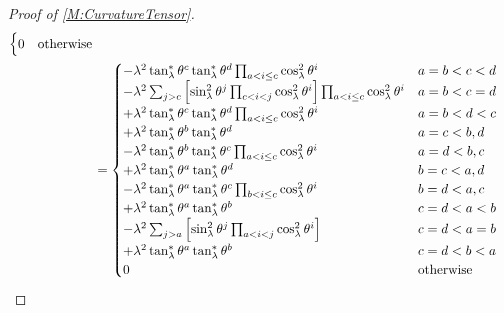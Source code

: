 \documentclass[../methodology.tex]{subfiles}
\begin{document}
\begin{proof}[Proof of \cref{M:CurvatureTensor}]
\begin{align*}
\begin{cases}
          0 & \text{otherwise}   \\
        \end{cases}                                                  \\
     & =\begin{cases}
          -\lambda^2\tan_\lambda^\ast\tensor{\theta}{^c}\tan_\lambda^\ast\tensor{\theta}{^d}\prod_{a<i\le c}\cos_\lambda^2\tensor{\theta}{^i}
            & \text{\(a=b<c<d\)} \\
          -\lambda^2
          \sum_{j>c}
          \left[
            \sin_\lambda^2\tensor{\theta}{^j}\prod_{c<i<j}\cos_\lambda^2\tensor{\theta}{^i}
            \right]
          \prod_{a<i\le c}\cos_\lambda^2\tensor{\theta}{^i}
            & \text{\(a=b<c=d\)} \\
          +\lambda^2\tan_\lambda^\ast\tensor{\theta}{^c}\tan_\lambda^\ast\tensor{\theta}{^d}\prod_{a<i\le c}\cos_\lambda^2\tensor{\theta}{^i}
            & \text{\(a=b<d<c\)} \\
          +\lambda^2\tan_\lambda^\ast\tensor{\theta}{^b}\tan_\lambda^\ast\tensor{\theta}{^d}
            & \text{\(a=c<b,d\)} \\
          -\lambda^2\tan_\lambda^\ast\tensor{\theta}{^b}\tan_\lambda^\ast\tensor{\theta}{^c}\prod_{a<i\le c}\cos_\lambda^2\tensor{\theta}{^i}
            & \text{\(a=d<b,c\)} \\
          +\lambda^2\tan_\lambda^\ast\tensor{\theta}{^a}\tan_\lambda^\ast\tensor{\theta}{^d}
            & \text{\(b=c<a,d\)} \\
          -\lambda^2\tan_\lambda^\ast\tensor{\theta}{^a}\tan_\lambda^\ast\tensor{\theta}{^c}\prod_{b<i\le c}\cos_\lambda^2\tensor{\theta}{^i}
            & \text{\(b=d<a,c\)} \\
          +\lambda^2\tan_\lambda^\ast\tensor{\theta}{^a}\tan_\lambda^\ast\tensor{\theta}{^b}
            & \text{\(c=d<a<b\)} \\
          -\lambda^2
          \sum_{j>a}
          \left[
            \sin_\lambda^2\tensor{\theta}{^j}\prod_{a<i<j}\cos_\lambda^2\tensor{\theta}{^i}
            \right]
            & \text{\(c=d<a=b\)} \\
          +\lambda^2\tan_\lambda^\ast\tensor{\theta}{^a}\tan_\lambda^\ast\tensor{\theta}{^b}
            & \text{\(c=d<b<a\)} \\
          0 & \text{otherwise}   \\
        \end{cases}                                                  \\

\end{align*}
\end{proof}
\end{document}
